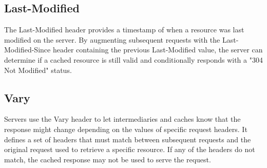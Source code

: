 \subsection{Last-Modified} The Last-Modified header provides a timestamp of when a resource was last modified on the server. By augmenting subsequent requests with the Last-Modified-Since header containing the previous Last-Modified value, the server can determine if a cached resource is still valid and conditionally responds with a "304 Not Modified" status.

\subsection{Vary} Servers use the Vary header to let intermediaries and caches know that the response might change depending on the values of specific request headers. It defines a set of headers that must match between subsequent requests and the original request used to retrieve a specific resource. If any of the headers do not match, the cached response may not be used to serve the request.
